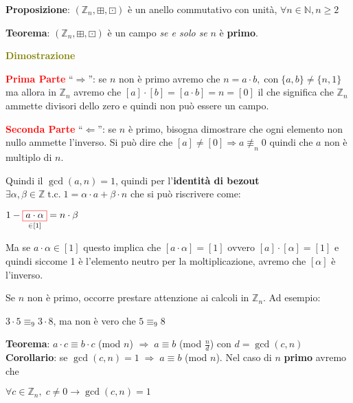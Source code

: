 \begin{flushleft}
    \textbf{Proposizione}: $(\mathbb{Z}_n, \boxplus, \boxdot)$ è un anello commutativo con unità, $\forall n \in \mathbb{N}, n \geq 2$ 

    \textbf{Teorema}: $(\mathbb{Z}_n, \boxplus, \boxdot)$ è un campo \textit{se e solo se} $n$ è \textbf{primo}.

    \begin{boxA}
        \textcolor{olive}{\textbf{Dimostrazione}}
        
        \textcolor{red}{\textbf{Prima Parte}} ``$\Rightarrow$'': se $n$ non è primo avremo che $n = a \cdot b, \; \text{con} \; \{a, b\} \neq \{n, 1\}$ ma allora in $\mathbb{Z}_n$ avremo che $[a] \cdot [b] = [a \cdot b] = n = [0]$ il che significa che $\mathbb{Z}_n$ ammette divisori dello zero e quindi non può essere un campo.

        \textcolor{red}{\textbf{Seconda Parte}} ``$\Leftarrow$'': se $n$ è primo, bisogna dimostrare che ogni elemento non nullo ammette l'inverso. Si può dire che $[a] \neq [0] \Rightarrow a \not \equiv_n 0$ quindi che $a$ non è multiplo di $n$.

        Quindi il $\gcd (a, n) = 1$, quindi per l'\textbf{identità di bezout} $\exists \alpha, \beta \in \mathbb{Z} \; \text{t.c.} \; 1 = \alpha \cdot a + \beta \cdot n$ che si può riscrivere come:

        {\centering
            $1 - \underset{\in [1]}{\fcolorbox{red}{white}{$a \cdot \alpha$}} = n \cdot \beta$
        \par}
        Ma se $a \cdot \alpha \in [1]$ questo implica che $[a \cdot \alpha] = [1]$ ovvero $[a] \cdot [\alpha] = [1]$ e quindi siccome 1 è l'elemento neutro per la moltiplicazione, avremo che $[\alpha]$ è l'inverso.
    \end{boxA}

    Se $n$ non è primo, occorre prestare attenzione ai calcoli in $\mathbb{Z}_n$. Ad esempio:

    {\centering
        $3 \cdot 5 \equiv_9 3 \cdot 8$, ma non è vero che $5 \equiv_9 8$
    \par}
    \textbf{Teorema}: $a \cdot c \equiv b \cdot c$ (mod $n$) $\Rightarrow \; a \equiv b$ (mod $\frac{n}{d}$) con $d = \gcd (c, n)$ \\
    \textbf{Corollario}: se $\gcd (c, n) = 1 \; \Rightarrow \; a \equiv b$ (mod $n$). Nel caso di $n$ \textbf{primo} avremo che 
    
    {\centering
        $\forall c \in \mathbb{Z}_n, \; c \neq 0 \rightarrow \gcd (c, n) = 1$
    \par}
\end{flushleft}

